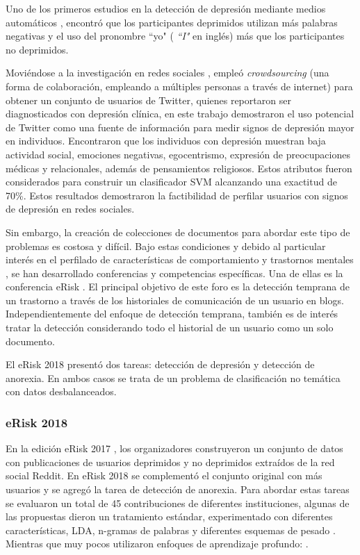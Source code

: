 Uno de los primeros estudios en la detección de depresión mediante medios automáticos \citep{rude2004language}, encontró que los participantes deprimidos utilizan más palabras negativas y el uso del pronombre ``yo" ( \textit{``I"} en inglés) más que los participantes no deprimidos. 

Moviéndose a la investigación en redes sociales \citep{de2013predicting}, empleó \textit{crowdsourcing} (una forma de colaboración, empleando a múltiples personas a través de internet) para obtener un conjunto de usuarios de Twitter, quienes reportaron ser diagnosticados con depresión clínica, en este trabajo demostraron el uso potencial de Twitter como una fuente de información para medir signos de depresión mayor en individuos. Encontraron que los individuos con depresión muestran baja actividad social, emociones negativas, egocentrismo, expresión de preocupaciones médicas y relacionales, además de pensamientos religiosos. Estos atributos fueron considerados para construir un clasificador SVM alcanzando una exactitud de 70\%. Estos resultados demostraron la factibilidad de perfilar usuarios con signos de depresión en redes sociales. 

Sin embargo, la creación de colecciones de documentos para abordar este tipo de problemas es costosa y difícil. Bajo estas condiciones y debido al particular interés en el perfilado de características de comportamiento \citep{kumar2018aggression} y trastornos mentales  \citep{de2013predicting}, se han desarrollado conferencias y competencias específicas.
Una de ellas es la conferencia eRisk \citep{Losada2018}. El principal objetivo de este foro es la detección temprana de un trastorno a través de los historiales de comunicación de un usuario en blogs. Independientemente del enfoque de detección temprana, también es de interés tratar la detección
considerando todo el historial de un usuario como un solo documento. 

El eRisk 2018 presentó dos tareas: detección de depresión y detección de anorexia. En ambos casos se trata de un problema de clasificación no temática con datos desbalanceados.


\subsubsection{eRisk 2018}

En la edición eRisk 2017 \citep{losada2017erisk, Losada2018}, los organizadores construyeron un conjunto de datos con publicaciones de usuarios deprimidos y no deprimidos extraídos de la red social Reddit. En eRisk 2018 se complementó el conjunto original con más usuarios y se agregó la tarea de detección de anorexia. Para abordar estas tareas se evaluaron un total de 45 contribuciones de diferentes instituciones, algunas de las propuestas dieron un tratamiento estándar, experimentado con diferentes características, LDA, n-gramas de palabras y diferentes esquemas de pesado \citep{cacheda2018analysis, almeida2017detecting, ortega2018peimex}. Mientras que muy pocos utilizaron enfoques de aprendizaje profundo: \citep{trotzek2018word, wang2018neural, liu2018tua1}.

